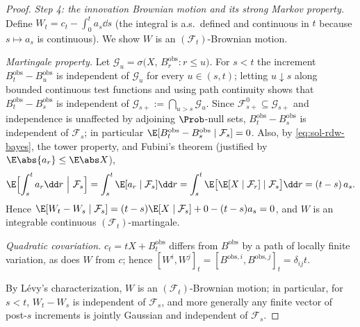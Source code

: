 \documentclass[../main.tex]{subfiles}
\begin{document}
\begin{proof}
\medskip
\noindent\emph{Step 4: the innovation Brownian motion and its strong Markov property.}
Define $W_t=c_t-\int_0^ta_s\dd s$ (the integral is a.s.\ defined and continuous in $t$
because $s\mapsto a_s$ is continuous).  We show $W$ is an $(\mathcal F_t)$-Brownian
motion.

\emph{Martingale property.}  Let $\mathcal G_u=\sigma\bigl(X,\,B^{\mathrm{obs}}_r:r\le
u\bigr)$.  For $s<t$ the increment $B^{\mathrm{obs}}_t-B^{\mathrm{obs}}_u$ is
independent of $\mathcal G_u$ for every $u\in(s,t)$; letting $u\downarrow s$ along
bounded continuous test functions and using path continuity shows that
$B^{\mathrm{obs}}_t-B^{\mathrm{obs}}_s$ is independent of
$\mathcal G_{s+}:=\bigcap_{u>s}\mathcal G_u$.  Since
$\mathcal F^0_{s+}\subseteq\mathcal G_{s+}$ and independence is unaffected by
adjoining $\Prob$-null sets, $B^{\mathrm{obs}}_t-B^{\mathrm{obs}}_s$ is independent of
$\mathcal F_s$; in particular
$\E[B^{\mathrm{obs}}_t-B^{\mathrm{obs}}_s\mid\mathcal F_s]=0$.  Also, by
\eqref{eq:sol-rdw-bayes}, the tower property, and Fubini's theorem (justified by
$\E\abs{a_r}\le\E\abs X$),
\[
  \E\Bigl[\int_s^ta_r\dd r\ \Big|\ \mathcal F_s\Bigr]
  =\int_s^t\E[a_r\mid\mathcal F_s]\dd r
  =\int_s^t\E\bigl[\E[X\mid\mathcal F_r]\mid\mathcal F_s\bigr]\dd r
  =(t-s)\,a_s .
\]
Hence
$\E[W_t-W_s\mid\mathcal F_s]
=(t-s)\E[X\mid\mathcal F_s]+0-(t-s)a_s=0$, and $W$ is an integrable continuous
$(\mathcal F_t)$-martingale.

\emph{Quadratic covariation.}  $c_t=tX+B^{\mathrm{obs}}_t$ differs from
$B^{\mathrm{obs}}$ by a path of locally finite variation, as does $W$ from $c$; hence
$[W^i,W^j]_t=[B^{\mathrm{obs},i},B^{\mathrm{obs},j}]_t=\delta_{ij}t$.

By L\'evy's characterization, $W$ is an $(\mathcal F_t)$-Brownian motion; in
particular, for $s<t$, $W_t-W_s$ is independent of $\mathcal F_s$, and more generally
any finite vector of post-$s$ increments is jointly Gaussian and independent of
$\mathcal F_s$.


\end{proof}
\end{document}
